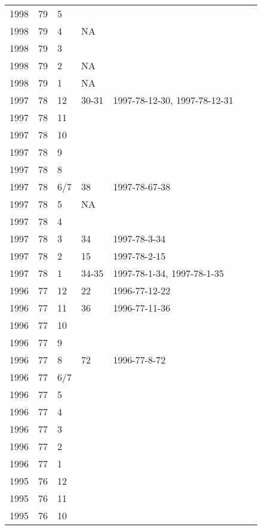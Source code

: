 \begin{longtable}{ |l|l|l|l|p{2.7cm}|l|p{2cm}| }
 1998 & 79 &     5 &         &  &  & \\
 1998 & 79 &     4 &     NA  &  &  & \\
 1998 & 79 &     3 &         &  &  & \\
 1998 & 79 &     2 &     NA  &  &  & \\
 1998 & 79 &     1 &     NA  &  &  & \\
 1997 & 78 &    12 &    30-31   & 1997-78-12-30, 1997-78-12-31  &  & \\
 1997 & 78 &    11 &         &  &  & \\
 1997 & 78 &    10 &         &  &  & \\
 1997 & 78 &     9 &         &  &  & \\
 1997 & 78 &     8 &         &  &  & \\
 1997 & 78 &   6/7 &    38   & 1997-78-67-38  &  & \\
 1997 & 78 &     5 &     NA  &  &  & \\
 1997 & 78 &     4 &         &  &  & \\
 1997 & 78 &     3 &    34   & 1997-78-3-34 &  & \\
 1997 & 78 &     2 &    15   & 1997-78-2-15  &  & \\
 1997 & 78 &     1 &   34-35 & 1997-78-1-34, 1997-78-1-35 &  & \\
 1996 & 77 &    12 &    22   & 1996-77-12-22 &  & \\
 1996 & 77 &    11 &    36   & 1996-77-11-36 &  & \\
 1996 & 77 &    10 &         &                &  & \\
 1996 & 77 &     9 &         &                &  & \\
 1996 & 77 &     8 &    72   & 1996-77-8-72 &  & \\
 1996 & 77 &   6/7 &         &                &  & \\
 1996 & 77 &     5 &         &                &  & \\
 1996 & 77 &     4 &         &                &  & \\
 1996 & 77 &     3 &         &                &  & \\
 1996 & 77 &     2 &         &                &  & \\
 1996 & 77 &     1 &         &                &  & \\
 1995 & 76 &    12 &         &                &  & \\
 1995 & 76 &    11 &         &                &  & \\
 1995 & 76 &    10 &         &                &  & \\

\end{longtable}
